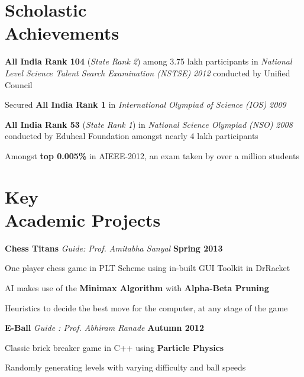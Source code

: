 \documentclass[margin,11pt]{resume}
\begin{document}
\begin{resume}
\vspace{40pt}
    \section{\mysidestyle Scholastic\\Achievements}
   \begin{list2}
\item \textbf{All India Rank 104} (\textsl{State Rank 2}) among 3.75 lakh participants in \textsl{National Level Science Talent Search Examination (NSTSE)} \textsl{2012} conducted by Unified Council
\item Secured \textbf{All India Rank 1} in \textsl{International Olympiad of Science (IOS)} \textsl{2009}
\item \textbf{All India Rank 53} (\textsl{State Rank 1}) in \textsl{National Science Olympiad (NSO)} \textsl{2008} conducted by Eduheal Foundation amongst nearly 4 lakh participants
\item Amongst \textbf{top 0.005\%} in AIEEE-2012, an exam taken by over a million students

 \end{list2}
    \section{\mysidestyle Key \\ Academic Projects}
    \textbf{Chess Titans}  \hspace{5em} \textsl{Guide: Prof. Amitabha Sanyal} \hspace{8em} \textbf{Spring 2013}
\vspace{-3.5mm}
\begin{list2}
\item One player chess game in PLT Scheme using in-built GUI Toolkit in DrRacket 
\item AI makes use of the \textbf{Minimax Algorithm} with \textbf{Alpha-Beta Pruning}
\item Heuristics to decide the best move for the computer, at any stage of the game
\end{list2}
\vspace{-2mm}
\textbf{E-Ball}  \hspace{8em} \textsl{Guide : Prof. Abhiram Ranade} \hspace{7em} \textbf{Autumn 2012}
\vspace{-3.5mm}
\begin{list2}
\item Classic brick breaker game in C++ using \textbf{Particle Physics} 
\item Randomly generating levels with varying difficulty and ball speeds 
\end{list2}


\end{resume}
\end{document}
